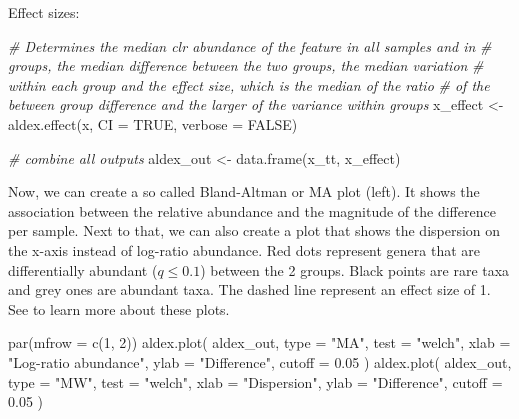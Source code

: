 \documentclass[
]{book}
\newenvironment{Shaded}{\begin{snugshade}}{\end{snugshade}}
\newcommand{\AttributeTok}[1]{\textcolor[rgb]{0.77,0.63,0.00}{#1}}
\newcommand{\CommentTok}[1]{\textcolor[rgb]{0.56,0.35,0.01}{\textit{#1}}}
\newcommand{\ConstantTok}[1]{\textcolor[rgb]{0.00,0.00,0.00}{#1}}
\newcommand{\DecValTok}[1]{\textcolor[rgb]{0.00,0.00,0.81}{#1}}
\newcommand{\FloatTok}[1]{\textcolor[rgb]{0.00,0.00,0.81}{#1}}
\newcommand{\FunctionTok}[1]{\textcolor[rgb]{0.00,0.00,0.00}{#1}}
\newcommand{\NormalTok}[1]{#1}
\newcommand{\OtherTok}[1]{\textcolor[rgb]{0.56,0.35,0.01}{#1}}
\newcommand{\StringTok}[1]{\textcolor[rgb]{0.31,0.60,0.02}{#1}}
\begin{document}
Effect sizes:

\begin{Shaded}
\begin{Highlighting}[]
\CommentTok{\# Determines the median clr abundance of the feature in all samples and in}
\CommentTok{\# groups, the median difference between the two groups, the median variation}
\CommentTok{\# within each group and the effect size, which is the median of the ratio}
\CommentTok{\# of the between group difference and the larger of the variance within groups}
\NormalTok{x\_effect }\OtherTok{\textless{}{-}} \FunctionTok{aldex.effect}\NormalTok{(x, }\AttributeTok{CI =} \ConstantTok{TRUE}\NormalTok{, }\AttributeTok{verbose =} \ConstantTok{FALSE}\NormalTok{)}

\CommentTok{\# combine all outputs }
\NormalTok{aldex\_out }\OtherTok{\textless{}{-}} \FunctionTok{data.frame}\NormalTok{(x\_tt, x\_effect)}
\end{Highlighting}
\end{Shaded}

Now, we can create a so called Bland-Altman or MA plot (left). It shows the
association between the relative abundance and the magnitude of the difference
per sample. Next to that, we can also create a plot that shows the dispersion
on the x-axis instead of log-ratio abundance. Red dots represent genera that are
differentially abundant (\(q \leq 0.1\)) between the 2 groups. Black points are
rare taxa and grey ones are abundant taxa. The dashed line represent an effect
size of 1. See \citet{Gloor2016} to learn more about these plots.

\begin{Shaded}
\begin{Highlighting}[]
\FunctionTok{par}\NormalTok{(}\AttributeTok{mfrow =} \FunctionTok{c}\NormalTok{(}\DecValTok{1}\NormalTok{, }\DecValTok{2}\NormalTok{))}
  \FunctionTok{aldex.plot}\NormalTok{(}
\NormalTok{    aldex\_out, }
    \AttributeTok{type =} \StringTok{"MA"}\NormalTok{, }
    \AttributeTok{test =} \StringTok{"welch"}\NormalTok{, }
    \AttributeTok{xlab =} \StringTok{"Log{-}ratio abundance"}\NormalTok{,}
    \AttributeTok{ylab =} \StringTok{"Difference"}\NormalTok{,}
    \AttributeTok{cutoff =} \FloatTok{0.05}
\NormalTok{  )}
  \FunctionTok{aldex.plot}\NormalTok{(}
\NormalTok{    aldex\_out, }
    \AttributeTok{type =} \StringTok{"MW"}\NormalTok{, }
    \AttributeTok{test =} \StringTok{"welch"}\NormalTok{,}
    \AttributeTok{xlab =} \StringTok{"Dispersion"}\NormalTok{,}
    \AttributeTok{ylab =} \StringTok{"Difference"}\NormalTok{,}
    \AttributeTok{cutoff =} \FloatTok{0.05}
\NormalTok{  )}
\end{Highlighting}
\end{Shaded}
\end{document}
